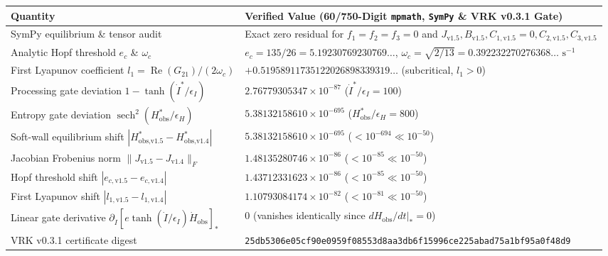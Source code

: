 \documentclass[11pt,a4paper]{article}
\theoremstyle{remark}
\begin{document}
\vspace{1.5pt}\noindent\begin{minipage}{\textwidth}\centering
{}
\vspace{1pt}
\small
\begin{tabularx}{\textwidth}{lX}
\toprule
\textbf{Quantity} & \textbf{Verified Value (60/750-Digit \texttt{mpmath}, \texttt{SymPy} \& VRK v0.3.1 Gate)} \\
\midrule
SymPy equilibrium \& tensor audit & \raggedright\arraybackslash Exact zero residual for $f_1=f_2=f_3=0$ and $J_{\text{v1.5}}, B_{\text{v1.5}}, C_{1,\text{v1.5}}=0, C_{2,\text{v1.5}}, C_{3,\text{v1.5}}$ \\
Analytic Hopf threshold $e_c$ \& $\omega_c$ & $e_c = 135/26 = 5.19230769230769\dots$, $\omega_c = \sqrt{2/13} = 0.392232270276368\dots\text{ s}^{-1}$ \\
First Lyapunov coefficient $l_1 = \operatorname{Re}(G_{21})/(2\omega_c)$ & $+0.51958911735122026898339319\dots$ (subcritical, $l_1 > 0$) \\
Processing gate deviation $1 - \tanh(\dot{I}^*/\epsilon_I)$ & $2.76779305347 \times 10^{-87}$ ($\dot{I}^*/\epsilon_I = 100$) \\
Entropy gate deviation $\operatorname{sech}^2(H_{\text{obs}}^*/\epsilon_H)$ & $5.38132158610 \times 10^{-695}$ ($H_{\text{obs}}^*/\epsilon_H = 800$) \\
Soft-wall equilibrium shift $|H_{\text{obs},\text{v1.5}}^* - H_{\text{obs},\text{v1.4}}^*|$ & $5.38132158610 \times 10^{-695}$ ($< 10^{-694} \ll 10^{-50}$) \\
Jacobian Frobenius norm $\|J_{\text{v1.5}} - J_{\text{v1.4}}\|_F$ & $1.48135280746 \times 10^{-86}$ ($< 10^{-85} \ll 10^{-50}$) \\
Hopf threshold shift $|e_{c,\text{v1.5}} - e_{c,\text{v1.4}}|$ & $1.43712331623 \times 10^{-86}$ ($< 10^{-85} \ll 10^{-50}$) \\
First Lyapunov shift $|l_{1,\text{v1.5}} - l_{1,\text{v1.4}}|$ & $1.10793084174 \times 10^{-82}$ ($< 10^{-81} \ll 10^{-50}$) \\
Linear gate derivative $\partial_{\dot{I}}[e\tanh(\dot{I}/\epsilon_I)\dot{H}_{\text{obs}}]_*$ & $0$ (vanishes identically since $dH_{\text{obs}}/dt|_* = 0$) \\
VRK v0.3.1 certificate digest & {\scriptsize\texttt{25db5306e05cf90e0959f08553d8aa3db6f15996ce225abad75a1bf95a0f48d9}} \\
\bottomrule
\end{tabularx}
\label{tab:audit50}
\end{minipage}\vspace{1.5pt}
\end{document}
